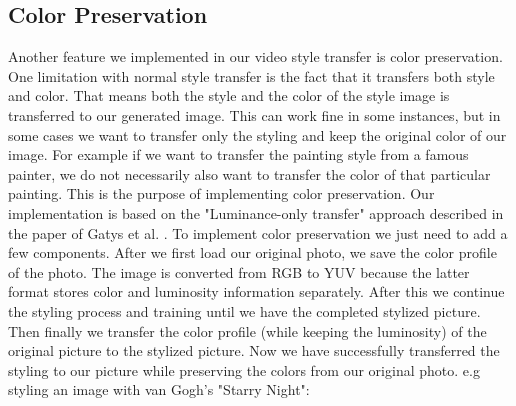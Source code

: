 \subsection{Color Preservation}
Another feature we implemented in our video style transfer is color preservation. One limitation with normal style transfer is the fact that it transfers both style and color. That means both the style and the color of the style image is transferred to our generated image. This can work fine in some instances, but in some cases we want to transfer only the styling and keep the original color of our image. For example if we want to transfer the painting style from a famous painter, we do not necessarily also want to transfer the color of that particular painting. This is the purpose of implementing color preservation.\newline\newline
Our implementation is based on the "Luminance-only transfer" approach described in the paper of Gatys et al. \cite{Gatys:2}. To implement color preservation we just need to add a few components. After we first load our original photo, we save the color profile of the photo. The image is converted from RGB to YUV because the latter format stores color and luminosity information separately. After this we continue the styling process and training until we have the completed stylized picture. Then finally we transfer the color profile (while keeping the luminosity) of the original picture to the stylized picture. Now we have successfully transferred the styling to our picture while preserving the colors from our original photo.\newline
e.g styling an image with van Gogh's "Starry Night":\newline
